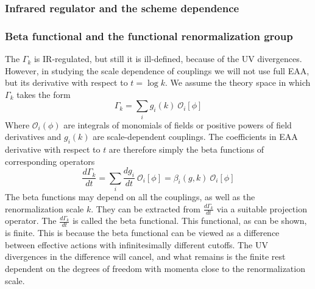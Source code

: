 \documentclass[11pt, a4paper]{article}
\begin{document}
\subsubsection*{\centering Infrared regulator and the scheme dependence}

\subsubsection*{\centering Beta functional and the functional renormalization group}

The $\Gamma_k$ is IR-regulated, but still it is ill-defined, because of the UV divergences. 
However, in studying the scale dependence of couplings we will not use full EAA, 
but its derivative with respect to $t = \log{k}$.
We assume the theory space in which $\Gamma_k$ takes the form
\begin{equation}
    \Gamma_k = \sum_i g_i(k) \ \mathcal{O}_i [\phi]
\end{equation}
Where $\mathcal{O}_i (\phi)$ are integrals of monomials of fields or positive powers of field derivatives 
and $g_i(k)$ are scale-dependent couplings.
The coefficients in EAA derivative with respect to $t$ are therefore simply the beta functions of corresponding operators
\begin{equation}
    \frac{d \Gamma_k}{dt} = \sum_i \frac{d g_i}{dt} \ \mathcal{O}_i [\phi] = \beta_i(g,k) \ \mathcal{O}_i [\phi]
\end{equation}
The beta functions may depend on all the couplings, as well as the renormalization scale $k$.
They can be extracted from $\frac{d \Gamma_k}{dt}$ via a suitable projection operator. 
The $\frac{d \Gamma_k}{dt}$ is called the beta functional. This functional, as can be shown, is finite.
This is because the beta functional can be viewed as a difference between effective actions with infinitesimally
different cutoffs. The UV divergences in the difference will cancel, and what remains is the finite rest
dependent on the degrees of freedom with momenta close to the renormalization scale.
\end{document}
